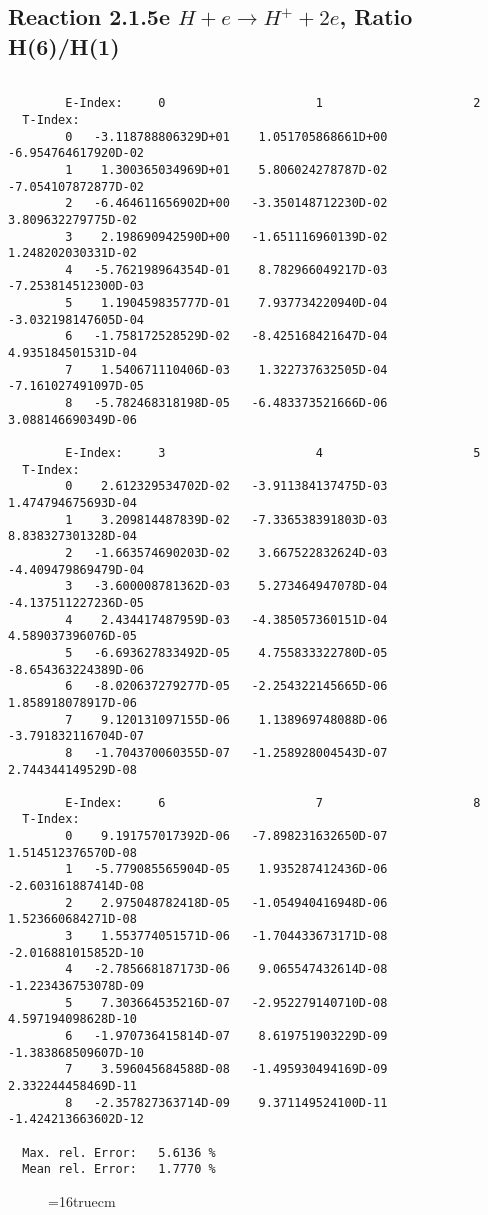 \documentclass[12pt]{article}
\begin{document}
\newpage
\subsection{
Reaction 2.1.5e  $H + e \rightarrow H^+ + 2e$, Ratio H(6)/H(1)
}


\begin{small}\begin{verbatim}

        E-Index:     0                     1                     2
  T-Index:
        0   -3.118788806329D+01    1.051705868661D+00   -6.954764617920D-02
        1    1.300365034969D+01    5.806024278787D-02   -7.054107872877D-02
        2   -6.464611656902D+00   -3.350148712230D-02    3.809632279775D-02
        3    2.198690942590D+00   -1.651116960139D-02    1.248202030331D-02
        4   -5.762198964354D-01    8.782966049217D-03   -7.253814512300D-03
        5    1.190459835777D-01    7.937734220940D-04   -3.032198147605D-04
        6   -1.758172528529D-02   -8.425168421647D-04    4.935184501531D-04
        7    1.540671110406D-03    1.322737632505D-04   -7.161027491097D-05
        8   -5.782468318198D-05   -6.483373521666D-06    3.088146690349D-06

        E-Index:     3                     4                     5
  T-Index:
        0    2.612329534702D-02   -3.911384137475D-03    1.474794675693D-04
        1    3.209814487839D-02   -7.336538391803D-03    8.838327301328D-04
        2   -1.663574690203D-02    3.667522832624D-03   -4.409479869479D-04
        3   -3.600008781362D-03    5.273464947078D-04   -4.137511227236D-05
        4    2.434417487959D-03   -4.385057360151D-04    4.589037396076D-05
        5   -6.693627833492D-05    4.755833322780D-05   -8.654363224389D-06
        6   -8.020637279277D-05   -2.254322145665D-06    1.858918078917D-06
        7    9.120131097155D-06    1.138969748088D-06   -3.791832116704D-07
        8   -1.704370060355D-07   -1.258928004543D-07    2.744344149529D-08

        E-Index:     6                     7                     8
  T-Index:
        0    9.191757017392D-06   -7.898231632650D-07    1.514512376570D-08
        1   -5.779085565904D-05    1.935287412436D-06   -2.603161887414D-08
        2    2.975048782418D-05   -1.054940416948D-06    1.523660684271D-08
        3    1.553774051571D-06   -1.704433673171D-08   -2.016881015852D-10
        4   -2.785668187173D-06    9.065547432614D-08   -1.223436753078D-09
        5    7.303664535216D-07   -2.952279140710D-08    4.597194098628D-10
        6   -1.970736415814D-07    8.619751903229D-09   -1.383868509607D-10
        7    3.596045684588D-08   -1.495930494169D-09    2.332244458469D-11
        8   -2.357827363714D-09    9.371149524100D-11   -1.424213663602D-12

  Max. rel. Error:   5.6136 %
  Mean rel. Error:   1.7770 %

\end{verbatim}\end{small}
\begin{figure} \label{2.1.5e}
\epsfxsize=16truecm
\end{figure}
\end{document}
